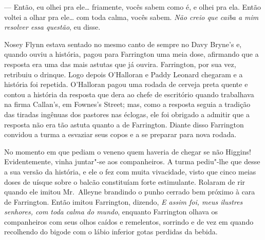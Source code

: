 --- Então, eu olhei pra ele\ldots{} friamente, vocês sabem como é, e olhei pra
ela.  Então voltei a olhar pra ele\ldots{} com toda calma, vocês sabem.
\textit{Não creio que caiba a mim resolver essa questão}, eu disse.

Nosey Flynn estava sentado no mesmo canto de sempre no Davy Bryne’s e, quando
ouviu a história, pagou para Farrington uma meia dose, afirmando que a resposta
era uma das mais astutas que já ouvira.  Farrington, por sua vez, retribuiu o
drinque.  Logo depois O’Halloran e Paddy Leonard chegaram e a história foi
repetida.  O’Halloran pagou uma rodada de cerveja preta quente e contou a
história da resposta que dera ao chefe de escritório quando trabalhava na firma
Callan’s, em Fownes’s Street; mas, como a resposta seguia a tradição das
tiradas ingênuas dos pastores nas éclogas, ele foi obrigado a admitir que a
resposta não era tão astuta quanto a de Farrington.  Diante disso Farrington
convidou a turma a esvaziar seus copos e a se preparar para nova rodada.

No momento em que pediam o veneno quem haveria de chegar se não Higgins!
Evidentemente, vinha juntar"-se aos companheiros.  A turma pediu"-lhe que desse a
sua versão da história, e ele o fez com muita vivacidade, visto que cinco meias
doses de uísque sobre o balcão constituíam forte estimulante.  Rolaram de rir
quando ele imitou Mr.~Alleyne brandindo o punho cerrado bem próximo à cara de
Farrington.  Então imitou Farrington, dizendo, \textit{E assim foi, meus
ilustres senhores, com toda calma do mundo}, enquanto Farrington olhava os
companheiros com seus olhos caídos e remelentos, sorrindo e de vez em quando
recolhendo do bigode com o lábio inferior gotas perdidas da bebida.

